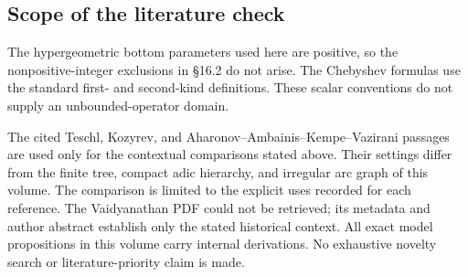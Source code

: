 \subsection*{Scope of the literature check}
The hypergeometric bottom parameters used here are positive, so the nonpositive-integer exclusions in \S16.2 do not arise. The Chebyshev formulas use the standard first- and second-kind definitions. These scalar conventions do not supply an unbounded-operator domain.

The cited Teschl, Kozyrev, and Aharonov--Ambainis--Kempe--Vazirani passages are used only for the contextual comparisons stated above. Their settings differ from the finite tree, compact adic hierarchy, and irregular arc graph of this volume. The comparison is limited to the explicit uses recorded for each reference. The Vaidyanathan PDF could not be retrieved; its metadata and author abstract establish only the stated historical context. All exact model propositions in this volume carry internal derivations. No exhaustive novelty search or literature-priority claim is made.
